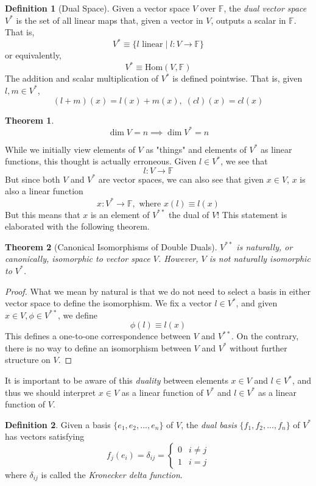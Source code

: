 \documentclass{article}
\newtheorem{theorem}{Theorem}[section]
\theoremstyle{remark}
\theoremstyle{definition}
\newtheorem{definition}{Definition}[section]
\begin{document}
\begin{definition}[Dual Space]
Given a vector space $V$ over $\mathbb{F}$, the \textit{dual vector space} $V^*$ is the set of all linear maps that, given a vector in $V$, outputs a scalar in $\mathbb{F}$. That is, 
\[ V^* \equiv \{ l \text{ linear} \; | \; l: V \longrightarrow \mathbb{F}\}\]
or equivalently, 
\[V^* \equiv \text{Hom}(V, \mathbb{F})\]
The addition and scalar multiplication of $V^*$ is defined pointwise. That is, given $l, m \in V^*$, 
\[(l + m) (x) = l(x) + m(x), \; (c l)(x) = c l(x)\]
\end{definition}

\begin{theorem}
\[ \dim{V} = n \implies \dim{V^*} = n\]
\end{theorem}

While we initially view elements of $V$ as "things" and elements of $V^*$ as linear functions, this thought is actually erroneous. Given $l \in V^*$, we see that 
\[l: V \longrightarrow \mathbb{F}\]
But since both $V$ and $V^*$ are vector spaces, we can also see that given $x \in V$, $x$ is also a linear function 
\[x: V^* \longrightarrow \mathbb{F}, \text{ where } x(l) \equiv l(x)\]
But this means that $x$ is an element of $V^{**}$ the dual of $V$! This statement is elaborated with the following theorem. 

\begin{theorem}[Canonical Isomorphisms of Double Duals]
$V^{**}$ is \textit{naturally, or canonically, isomorphic} to vector space $V$. However, $V$ is not naturally isomorphic to $V^*$. 
\end{theorem}

\begin{proof}
What we mean by natural is that we do not need to select a basis in either vector space to define the isomorphism. We fix a vector $l \in V^*$, and given $x \in V, \phi \in V^{**}$, we define
\[ \phi(l) \equiv l(x) \]
This defines a one-to-one correspondence between $V$ and $V^{**}$. On the contrary, there is no way to define an isomorphism between $V$ and $V^*$ without further structure on $V$. 
\end{proof}

It is important to be aware of this \textit{duality} between elements $x \in V$ and $l \in V^*$, and thus we should interpret $x \in V$ as a linear function of $V^*$ and $l \in V^*$ as a linear function of $V$.

\begin{definition}
Given a basis $\{ e_1, e_2, ..., e_n\}$ of $V$, the \textit{dual basis} $\{f_1, f_2, ..., f_n\}$ of $V^*$ has vectors satisfying 
\[ f_j (e_i) = \delta_{i j} = 
\begin{cases}
0 & i \neq j \\
1 & i = j
\end{cases}\]
where $\delta_{i j}$ is called the \textit{Kronecker delta function}. 
\end{definition}
\end{document}
